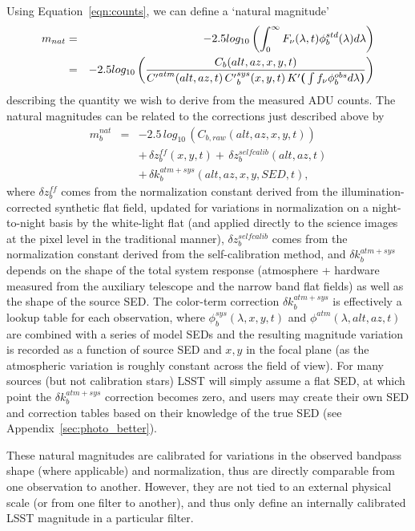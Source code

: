 \documentclass[12pt,preprint]{aastex}
\begin{document}
Using Equation~\ref{eqn:counts}, we can define a `natural magnitude'
\begin{eqnarray}
\label{eqn:defnatmags}
m_{nat} & = & -2.5 log_{10} \left( \int_0^\infty
   {F_\nu(\lambda,t)\phi_b^{std}(\lambda)  d\lambda} \right) \\
 & = &-2.5 log_{10} \left( {C_b(alt,az,x,y,t) \over 
{C'}^{atm}(alt,az,t) \, {C'}_b^{sys}(x,y,t) \,
K'{\textbf(} \int{ f_\nu \phi_b^{obs} d\lambda}{\textbf)} } \right) \nonumber \\
\end{eqnarray}
describing the quantity we wish to derive from the measured ADU
counts.  The natural magnitudes can be related to the corrections 
just described above by 
\begin{eqnarray}
\label{eqn:defnatmags2}
m_b^{nat} & = &-2.5 \, log_{10} \, (C_{b, raw}(alt,az,x,y,t))
\nonumber \\ 
 & & +\, \delta z_b^{ff}(x,y,t) + \, \delta z_b^{selfcalib}(alt,az,t)  \nonumber \\ 
 & & +\, \delta k_b^{atm+sys}(alt,az,x,y,SED,t), 
\end{eqnarray}
where $\delta z_b^{ff}$ comes from the normalization constant derived
from the illumination-corrected synthetic flat field, updated for
variations in normalization on a night-to-night basis by the
white-light flat (and applied directly to the science images at the
pixel level in the traditional manner), $\delta z_b^{selfcalib}$ comes
from the normalization constant derived from the self-calibration
method, and $\delta k_b^{atm+sys}$ depends on the shape of the total
system response (atmosphere + hardware measured from the auxiliary
telescope and the narrow band flat fields) as well as the shape of the
source SED. The color-term correction $\delta k_b^{atm+sys}$ is
effectively a lookup table for each observation, where
$\phi_b^{sys}(\lambda,x,y,t)$ and $\phi^{atm}(\lambda,alt,az,t)$ are
combined with a series of model SEDs and the resulting magnitude
variation is recorded as a function of source SED and $x,y$ in the
focal plane (as the atmospheric variation is roughly constant across
the field of view). For many sources (but not calibration stars) LSST
will simply assume a flat SED, at which point the $\delta
k_b^{atm+sys}$ correction becomes zero, and users may create their own
SED and correction tables based on their knowledge of the true SED
(see Appendix~\ref{sec:photo_better}).

These natural magnitudes are calibrated for variations in the
observed bandpass shape (where applicable) and normalization, thus are directly
comparable from one observation to another. However, they are not tied
to an external physical scale (or from one filter to another), and
thus only define an internally calibrated LSST magnitude in a
particular filter.
\end{document}

